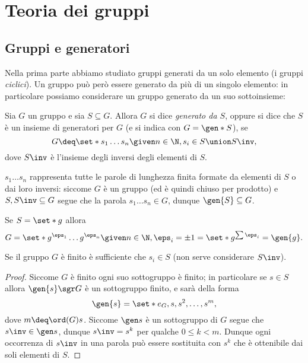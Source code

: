 \chapter{Teoria dei gruppi}

\section{Gruppi e generatori}

Nella prima parte abbiamo studiato gruppi generati da un solo elemento (i gruppi \emph{ciclici}). Un gruppo può però essere generato da più di un singolo elemento: in particolare possiamo considerare un gruppo generato da un suo sottoinsieme:

\begin{definition}
    Sia $G$ un gruppo e sia $S \subseteq G$. Allora $G$ si dice \emph{generato da $S$}, oppure si dice che $S$ è un insieme di generatori per $G$ (e si indica con $G = \gen*{S}$), se \[
        G \deq \set*{s_1\dots s_n \given n \in \N, s_i \in S \union S\inv},
    \] dove $S\inv$ è l'insieme degli inversi degli elementi di $S$.
\end{definition}

\begin{remark}
    $s_1 \dots s_n$ rappresenta tutte le parole di lunghezza finita formate da elementi di $S$ o dai loro inversi: siccome $G$ è un gruppo (ed è quindi chiuso per prodotto) e $S, S\inv \subseteq G$ segue che la parola $s_1 \dots s_n \in G$, dunque $\gen{S} \subseteq G$.
\end{remark}

\begin{remark}
    Se $S = \set*{g}$ allora \[
        G = \set*{g^{\eps_1}\dots g^{\eps_n} \given n \in \N, \eps_i = \pm 1} = \set*{g^{\sum \eps_i}} = \gen{g}.
    \]
\end{remark}

\begin{remark}
    Se il gruppo $G$ è finito è sufficiente che $s_i \in S$ (non serve considerare $S\inv$).
    \begin{proof}
        Siccome $G$ è finito ogni suo sottogruppo è finito; in particolare se $s \in S$ allora $\gen{s} \sgr G$ è un sottogruppo finito, e sarà della forma \[
            \gen{s} = \set*{e_G, s, s^2, \dots, s^m},    
        \] dove $m \deq \ord(G){s}$.
        Siccome $\gen s$ è un sottogruppo di $G$ segue che $s\inv \in \gen s$, dunque $s\inv = s^k$ per qualche $0 \leq k < m$.
        Dunque ogni occorrenza di $s\inv$ in una parola può essere sostituita con $s^k$ che è ottenibile dai soli elementi di $S$. 
    \end{proof}
\end{remark}

